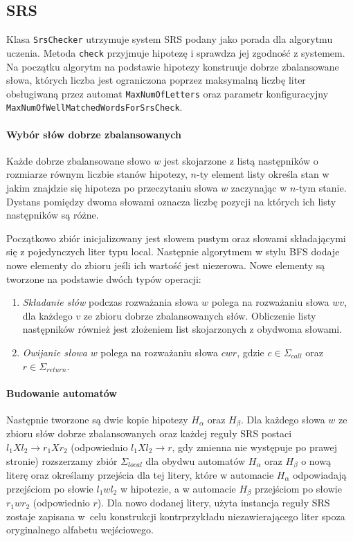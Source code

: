 \subsection{SRS}

Klasa \texttt{SrsChecker} utrzymuje system SRS podany jako porada dla algorytmu uczenia. Metoda \texttt{check} przyjmuje hipotezę i
sprawdza jej zgodność z systemem. Na początku algorytm na podstawie hipotezy konstruuje dobrze zbalansowane słowa, których liczba jest ograniczona
poprzez maksymalną liczbę liter obsługiwaną przez automat \texttt{MaxNumOfLetters} oraz parametr konfiguracyjny \texttt{MaxNumOfWell\-Mat\-ched\-Words\-ForSrsCheck}.

\paragraph{Wybór słów dobrze zbalansowanych}
Każde dobrze zbalansowane słowo $w$ jest skojarzone z listą następników o rozmiarze równym liczbie stanów hipotezy, $n$-ty element listy określa stan w jakim znajdzie się
hipoteza po przeczytaniu słowa $w$ zaczynając w $n$-tym stanie. Dystans pomiędzy dwoma słowami oznacza liczbę pozycji na których ich listy następników są różne.

Początkowo zbiór inicjalizowany jest słowem pustym oraz słowami składającymi się z pojedynczych liter typu local.
Następnie algorytmem w stylu BFS dodaje nowe elementy do zbioru jeśli ich wartość jest niezerowa.
Nowe elementy są tworzone na podstawie dwóch typów operacji:

\begin{enumerate}
    \item \emph{Składanie słów} podczas rozważania słowa $w$ polega na rozważaniu słowa $wv$, dla każdego $v$ ze zbioru dobrze zbalansowanych słów.
        Obliczenie listy następników również jest złożeniem list skojarzonych z obydwoma słowami.
    \item \emph{Owijanie słowa} $w$ polega na rozważaniu słowa $cwr$, gdzie $c \in \Sigma_{call}$ oraz $r \in \Sigma_{return}$.
\end{enumerate}

\paragraph{Budowanie automatów}
Następnie tworzone są dwie kopie hipotezy $H_{\alpha}$ oraz $H_{\beta}$. Dla każdego słowa $w$ ze zbioru słów dobrze zbalansowanych oraz każdej reguły SRS postaci
$l_1Xl_2 \to r_1Xr_2$ (odpowiednio $l_1Xl_2 \to r$, gdy zmienna nie występuje po prawej stronie) rozszerzamy zbiór $\Sigma_{local}$ dla obydwu automatów $H_{\alpha}$
oraz $H_{\beta}$ o nową literę oraz określamy przejścia dla tej litery,
które w automacie $H_{\alpha}$ odpowiadają przejściom po słowie $l_1wl_2$ w hipotezie, a w automacie $H_{\beta}$ przejściom po słowie $r_1wr_2$ (odpowiednio $r$).
Dla nowo dodanej litery, użyta instancja reguły SRS zostaje zapisana w~celu konstrukcji kontrprzykładu niezawierającego liter spoza oryginalnego alfabetu wejściowego.

